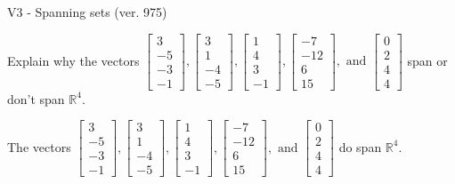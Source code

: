 \begin{exercise}
  \begin{exerciseTitle}V3 - Spanning sets (ver. 975)\end{exerciseTitle}
  \begin{exerciseStatement}
    Explain why the vectors \(\left[\begin{array}{r}
3 \\
-5 \\
-3 \\
-1
\end{array}\right] , \left[\begin{array}{r}
3 \\
1 \\
-4 \\
-5
\end{array}\right] , \left[\begin{array}{r}
1 \\
4 \\
3 \\
-1
\end{array}\right] , \left[\begin{array}{r}
-7 \\
-12 \\
6 \\
15
\end{array}\right] , \text{ and } \left[\begin{array}{r}
0 \\
2 \\
4 \\
4
\end{array}\right]\) span or don't span \(\mathbb{R}^4\). 
	


  \end{exerciseStatement}
  \begin{exerciseAnswer}
   The vectors \(\left[\begin{array}{r}
3 \\
-5 \\
-3 \\
-1
\end{array}\right] , \left[\begin{array}{r}
3 \\
1 \\
-4 \\
-5
\end{array}\right] , \left[\begin{array}{r}
1 \\
4 \\
3 \\
-1
\end{array}\right] , \left[\begin{array}{r}
-7 \\
-12 \\
6 \\
15
\end{array}\right] , \text{ and } \left[\begin{array}{r}
0 \\
2 \\
4 \\
4
\end{array}\right]\) 
  	 do  
	span \(\mathbb{R}^4\).
  



\end{exerciseAnswer}
\end{exercise}
